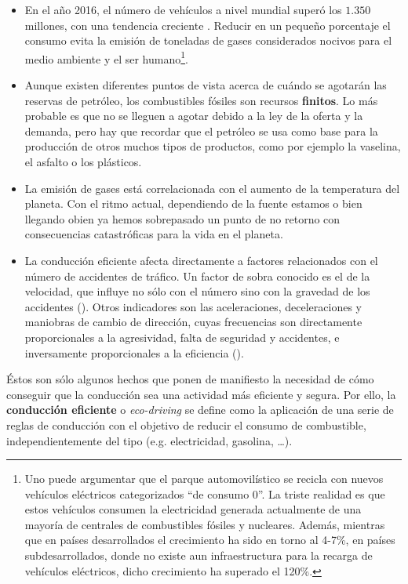 \begin{itemize}
	\item En el año 2016, el número de vehículos a nivel mundial superó los $1.350$ millones, con una tendencia creciente \cite{oica2014motrate}. Reducir en un pequeño porcentaje el consumo evita la emisión de toneladas de gases considerados nocivos para el medio ambiente y el ser humano\footnote{Uno puede argumentar que el parque automovilístico se recicla con nuevos vehículos eléctricos categorizados \enquote{de consumo 0}. La triste realidad es que estos vehículos consumen la electricidad generada actualmente de una mayoría de centrales de combustibles fósiles y nucleares. Además, mientras que en países desarrollados el crecimiento ha sido en torno al 4-7\%, en países subdesarrollados, donde no existe aun infraestructura para la recarga de vehículos eléctricos, dicho crecimiento ha superado el 120\%.}.
	\item Aunque existen diferentes puntos de vista acerca de cuándo se agotarán las reservas de petróleo, los combustibles fósiles son recursos \textbf{finitos}. Lo más probable es que no se lleguen a agotar debido a la ley de la oferta y la demanda, pero hay que recordar que el petróleo se usa como base para la producción de otros muchos tipos de productos, como por ejemplo la vaselina, el asfalto o los plásticos.
	\item La emisión de gases está correlacionada con el aumento de la temperatura del planeta. Con el ritmo actual, dependiendo de la fuente estamos o bien llegando obien ya hemos sobrepasado un punto de no retorno con consecuencias catastróficas para la vida en el planeta.
	\item La conducción eficiente afecta directamente a factores relacionados con el número de accidentes de tráfico. Un factor de sobra conocido es el de la velocidad, que influye no sólo con el número sino con la gravedad de los accidentes (\cite{imprialou2016re}). Otros indicadores son las aceleraciones, deceleraciones y maniobras de cambio de dirección, cuyas frecuencias son directamente proporcionales a la agresividad, falta de seguridad y accidentes, e inversamente proporcionales a la eficiencia (\cite{dingus2006100, lerner2010exploration}).
\end{itemize}

Éstos son sólo algunos hechos que ponen de manifiesto la necesidad de cómo conseguir que la conducción sea una actividad más eficiente y segura. Por ello, la \textbf{conducción eficiente} o \textit{eco-driving} se define como la aplicación de una serie de reglas de conducción con el objetivo de reducir el consumo de combustible, independientemente del tipo (e.g. electricidad, gasolina, \ldots).

